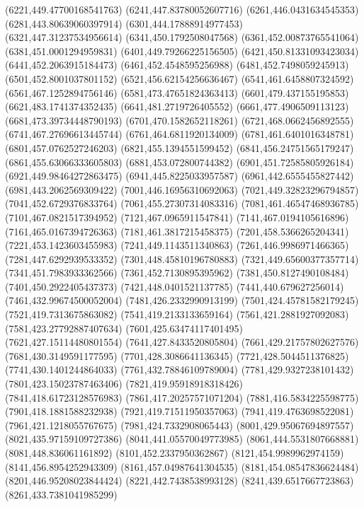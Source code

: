 {(6221,449.47700168541763)
(6241,447.83780052607716)
(6261,446.0431634545353)
(6281,443.80639060397914)
(6301,444.17888914977453)
(6321,447.31237534956614)
(6341,450.1792508047568)
(6361,452.00873765541064)
(6381,451.0001294959831)
(6401,449.79266225156505)
(6421,450.81331093423034)
(6441,452.2063915184473)
(6461,452.4548595256988)
(6481,452.7498059245913)
(6501,452.8001037801152)
(6521,456.62154256636467)
(6541,461.6458807324592)
(6561,467.1252894756146)
(6581,473.47651824363413)
(6601,479.437155195853)
(6621,483.1741374352435)
(6641,481.2719726405552)
(6661,477.4906509113123)
(6681,473.39734448790193)
(6701,470.1582652118261)
(6721,468.0662456892555)
(6741,467.27696613445744)
(6761,464.6811920134009)
(6781,461.6401016348781)
(6801,457.0762527246203)
(6821,455.1394551599452)
(6841,456.24751565179247)
(6861,455.63066333605803)
(6881,453.072800744382)
(6901,451.72585805926184)
(6921,449.98464272863475)
(6941,445.8225033957587)
(6961,442.6555455827442)
(6981,443.2062569309422)
(7001,446.16956310692063)
(7021,449.32823296794857)
(7041,452.6729376833764)
(7061,455.27307314083316)
(7081,461.46547468936785)
(7101,467.0821517394952)
(7121,467.0965911547841)
(7141,467.0194105616896)
(7161,465.0167394726363)
(7181,461.3817215458375)
(7201,458.5366265204341)
(7221,453.1423603455983)
(7241,449.1143511340863)
(7261,446.9986971466365)
(7281,447.6292939533352)
(7301,448.45810196780883)
(7321,449.65600377357714)
(7341,451.7983933362566)
(7361,452.7130895395962)
(7381,450.8127490108484)
(7401,450.2922405437373)
(7421,448.0401521137785)
(7441,440.679627256014)
(7461,432.99674500052004)
(7481,426.2332990913199)
(7501,424.45781582179245)
(7521,419.7313675863082)
(7541,419.2133133659164)
(7561,421.2881927092083)
(7581,423.27792887407634)
(7601,425.63474117401495)
(7621,427.15114480801554)
(7641,427.8433520805804)
(7661,429.21757802627576)
(7681,430.3149591177595)
(7701,428.3086641136345)
(7721,428.5044511376825)
(7741,430.1401244864033)
(7761,432.78846109789004)
(7781,429.9327238101432)
(7801,423.15023787463406)
(7821,419.95918918318426)
(7841,418.61723128576983)
(7861,417.20257571071204)
(7881,416.5834225598775)
(7901,418.1881588232938)
(7921,419.71511950357063)
(7941,419.4763698522081)
(7961,421.1218055767675)
(7981,424.7332908065443)
(8001,429.95067694897557)
(8021,435.97159109727386)
(8041,441.05570049773985)
(8061,444.5531807668881)
(8081,448.836061161892)
(8101,452.2337950362867)
(8121,454.9989962974159)
(8141,456.8954252943309)
(8161,457.04987641304535)
(8181,454.08547836624484)
(8201,446.95208023844424)
(8221,442.7438538993128)
(8241,439.6517667723863)
(8261,433.7381041985299)
}
